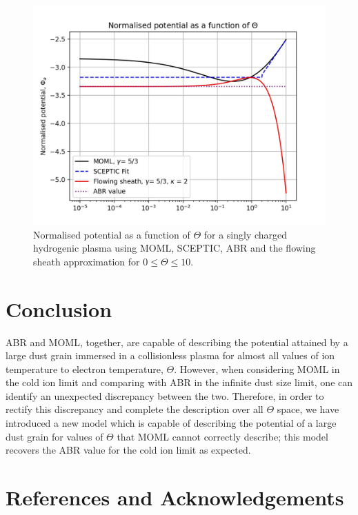 \documentclass{article}
\begin{document}
\begin{figure}[H]
\centering
\includegraphics[width=\linewidth]{Output/ModelComparions.jpeg}
\caption{Normalised potential as a function of $\Theta$ for a singly charged hydrogenic plasma using MOML, SCEPTIC,
ABR and the flowing sheath approximation for $0 \leq \Theta \leq 10$.}
\label{ModelComparions} 
\end{figure}

\section{Conclusion}

ABR and MOML, together, are capable of describing the 
potential attained by a large dust grain immersed in a collisionless plasma
for almost all values of ion temperature to electron temperature, $\Theta$. 
However, when considering MOML in the cold 
ion limit and comparing with ABR in the infinite dust size limit, one can identify an 
unexpected discrepancy between the two. Therefore, in order to rectify this 
discrepancy and complete the description over all $\Theta$ space, we have introduced a new model 
which is capable of describing the potential of a large dust grain for values 
of $\Theta$ that MOML cannot correctly describe; this model recovers 
the ABR value for the cold ion limit as expected.

\newpage

\section{References and Acknowledgements}


\end{document}
